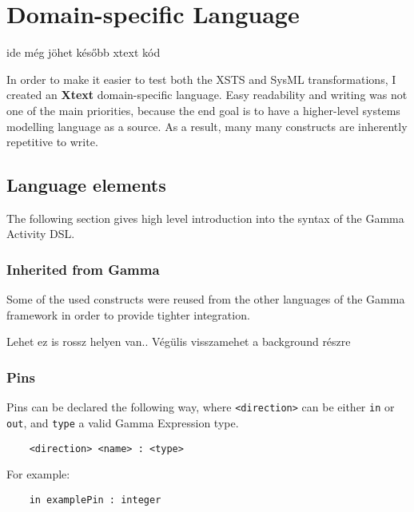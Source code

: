 \clearpage\section{Domain-specific Language}

ide még jöhet később xtext kód

In order to make it easier to test both the XSTS and SysML transformations, I created an \textbf{Xtext} domain-specific language. Easy readability and writing was not one of the main priorities, because the end goal is to have a higher-level systems modelling language as a source. As a result, many many constructs are inherently repetitive to write.

\subsection{Language elements}

The following section gives high level introduction into the syntax of the Gamma Activity DSL.

\subsubsection*{Inherited from Gamma}

Some of the used constructs were reused from the other languages of the Gamma framework in order to provide tighter integration.

Lehet ez is rossz helyen van.. Végülis visszamehet a background részre

\subsubsection*{Pins}\label{sssec:pins}

Pins can be declared the following way, where \verb|<direction>| can be either \verb|in| or \verb|out|, and \verb|type| a valid Gamma Expression type.

\begin{verbatim}
	<direction> <name> : <type>
\end{verbatim}

For example: 

\begin{verbatim}
	in examplePin : integer
\end{verbatim}


